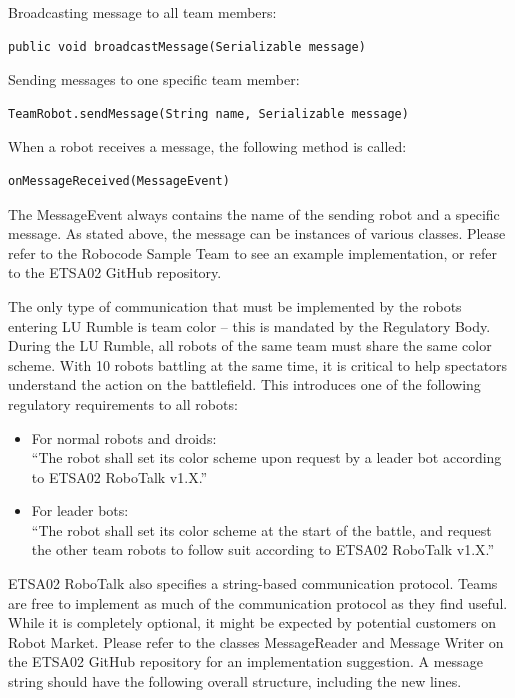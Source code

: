 \documentclass{scrreprt}
\begin{document}
Broadcasting message to all team members:
\begin{verbatim}
public void broadcastMessage(Serializable message)
\end{verbatim}

Sending messages to one specific team member:
\begin{verbatim}
TeamRobot.sendMessage(String name, Serializable message)
\end{verbatim}

When a robot receives a message, the following method is called:
\begin{verbatim}
onMessageReceived(MessageEvent)
\end{verbatim}

The MessageEvent always contains the name of the sending robot and a specific message. As stated above, the message can be instances of various classes. Please refer to the Robocode Sample Team to see an example implementation, or refer to the ETSA02 GitHub repository.

The only type of communication that must be implemented by the robots entering LU Rumble is team color -- this is mandated by the Regulatory Body. During the LU Rumble, all robots of the same team must share the same color scheme. With 10 robots battling at the same time, it is critical to help spectators understand the action on the battlefield. This introduces one of the following regulatory requirements to all robots: 

\begin{itemize}
\item For normal robots and droids:\\``The robot shall set its color scheme upon request by a leader bot according to ETSA02 RoboTalk v1.X.''
\item For leader bots:\\``The robot shall set its color scheme at the start of the battle, and request the other team robots to follow suit according to ETSA02 RoboTalk v1.X.''
\end{itemize}

ETSA02 RoboTalk also specifies a string-based communication protocol. Teams are free to implement as much of the communication protocol as they find useful. While it is completely optional, it might be expected by potential customers on Robot Market. Please refer to the classes MessageReader and Message Writer on the ETSA02 GitHub repository for an implementation suggestion. A message string should have the following overall structure, including the new lines.
\end{document}
